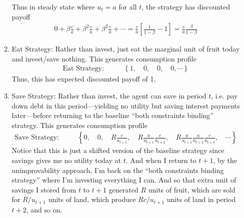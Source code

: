 \documentclass[12pt]{article}
\theoremstyle{plain}
\theoremstyle{definition}
\theoremstyle{remark}
\begin{document}
\begin{enumerate}
\begin{enumerate}[label=(\roman*)]
        Thus in steady state where $u_t=a$ for all $t$, the strategy has
        discounted payoff
        \begin{align*}
            0
            +
            \beta
            \frac{c}{a}
            +
            \beta^2
            \frac{c}{a}
            +
            \beta^2
            \frac{c}{a}
            +
            \cdots
            =
            \frac{c}{a}
            \left[
            \frac{1}{1-\beta}
            -1
            \right]
            =
            \frac{c}{a}
            \frac{\beta}{1-\beta}
        \end{align*}

      \item Eat Strategy: Rather than invest, just eat the marginal unit
        of fruit today and invest/save nothing.
        This generates consumption profile
        \begin{align*}
          \text{Eat Strategy}:&\qquad
          \left\{
            1,
            \quad
            0,
            \quad
            0,
            \quad
            0,\cdots
          \right\}
        \end{align*}
        Thus, this has expected discounted payoff of 1.

      \item Save Strategy: Rather than invest, the agent can save in
        period $t$, i.e. pay down debt in this period---yielding no
        utility but saving interest payments later---before returning to
        the baseline ``both constraints binding'' strategy.
        This generates consumption profile
        \begin{align*}
          \text{Save Strategy}:&\qquad
          \left\{
            0,
            \quad
            0,
            \quad
            R\frac{c}{u_{t+1}},
            \quad
            R\frac{a}{u_{t+1}}
            \frac{c}{u_{t+2}}
            ,
            \quad
            R\frac{a}{u_{t+1}}
            \frac{a}{u_{t+2}}
            \frac{c}{u_{t+3}}
            ,
            \quad
            \cdots
          \right\}
        \end{align*}
        Notice that this is just a shifted version of the baseline
        strategy since savings gives me no utility today at $t$.
        And when I return to $t+1$, by the unimprovability approach, I'm
        back on the ``both constraints binding strategy'' where I'm
        investing everything I can.
        And so that extra unit of savings I stored from $t$ to $t+1$
        generated $R$ units of fruit, which are sold for $R/u_{t+1}$
        units of land, which produce $Rc/u_{t+1}$ units of land in
        period $t+2$, and so on.


\end{enumerate}
\end{enumerate}
\end{document}
